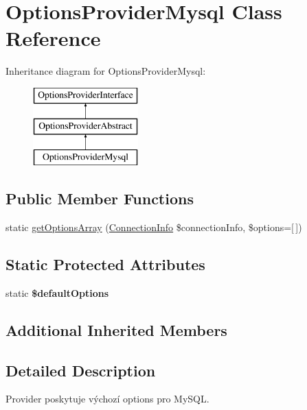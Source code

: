 \hypertarget{class_pes_1_1_database_1_1_handler_1_1_options_provider_1_1_options_provider_mysql}{}\section{Options\+Provider\+Mysql Class Reference}
\label{class_pes_1_1_database_1_1_handler_1_1_options_provider_1_1_options_provider_mysql}
Inheritance diagram for Options\+Provider\+Mysql\+:\begin{figure}[H]
\begin{center}
\leavevmode
\includegraphics[height=3.000000cm]{class_pes_1_1_database_1_1_handler_1_1_options_provider_1_1_options_provider_mysql}
\end{center}
\end{figure}
\subsection*{Public Member Functions}
\begin{DoxyCompactItemize}
\item 
static \mbox{\hyperlink{class_pes_1_1_database_1_1_handler_1_1_options_provider_1_1_options_provider_mysql_a7762424987993a98ba044cf1715dd44f}{get\+Options\+Array}} (\mbox{\hyperlink{class_pes_1_1_database_1_1_handler_1_1_connection_info}{Connection\+Info}} \$connection\+Info, \$options=\mbox{[}$\,$\mbox{]})
\end{DoxyCompactItemize}
\subsection*{Static Protected Attributes}
\begin{DoxyCompactItemize}
\item 
static {\bfseries \$default\+Options}
\end{DoxyCompactItemize}
\subsection*{Additional Inherited Members}


\subsection{Detailed Description}
Provider poskytuje výchozí options pro My\+S\+QL. 

